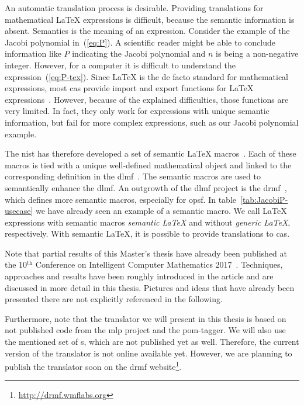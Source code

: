 An automatic translation process is desirable. Providing translations for mathematical \LaTeX{} expressions is difficult, because the semantic information is absent. Semantics is the meaning of an expression. Consider the example of the Jacobi polynomial in~(\ref{eq:P}). A scientific reader might be able to conclude information like $P$ indicating the Jacobi polynomial and $n$ is being a non-negative integer. However, for a computer it is difficult to understand the expression~(\ref{eq:P-tex}). Since \LaTeX{} is the de facto standard for mathematical expressions, most \gls*{cas} provide import and export functions for \LaTeX{} expressions~\cite{Maple:ImportExport,Mathematica:ImportExport,Matlab:ImportExport,Sage:ImportExport}. However, because of the explained difficulties, those functions are very limited. In fact, they only work for expressions with unique semantic information, but fail for more complex expressions, such as our Jacobi polynomial example.

The \gls*{nist} has therefore developed a set of semantic \LaTeX{} macros~\cite{DLMF:Macros}. Each of these macros is tied with a unique well-defined mathematical object and linked to the corresponding definition in the \gls*{dlmf}~\cite{NIST:DLMF,NIST:DLMF:Paper,NIST:Handbook}. The semantic macros are used to semantically enhance the \gls*{dlmf}. An outgrowth of the \gls*{dlmf} project is the \gls*{drmf}~\cite{DRMF:14,DRMF:15}, which defines more semantic macros, especially for \gls*{opsf}. In table~\ref{tab:JacobiP-usecase} we have already seen an example of a semantic macro. We call \LaTeX{} expressions with semantic macros \textit{semantic \LaTeX{}} and without \textit{generic \LaTeX}, respectively. With semantic \LaTeX, it is possible to provide translations to \gls*{cas}.

Note that partial results of this Master's thesis have already been published at the 10$^\text{th}$ Conference on Intelligent Computer Mathematics 2017~\cite{CICM:Paper}. Techniques, approaches and results have been roughly introduced in the article and are discussed in more detail in this thesis. Pictures and ideas that have already been presented there are not explicitly referenced in the following.

Furthermore, note that the translator we will present in this thesis is based on not published code from the \gls*{mlp} project and the \gls*{pom}-tagger. We will also use the mentioned set of \Macro s, which are not published yet as well. Therefore, the current version of the translator is not online available yet. However, we are planning to publish the translator soon on the \gls*{drmf} website\footnote{\url{http://drmf.wmflabs.org}}.

